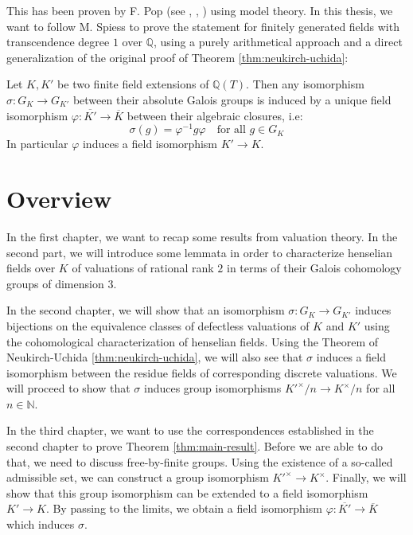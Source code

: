 This has been proven by F. Pop (see \cite{Po90}, \cite{Po94}, \cite{Po95}) using model theory. In this thesis, we want to follow M. Spiess \cite{Sp96} to prove the statement for finitely generated fields with transcendence degree $1$ over $\mathbb{Q}$, using a purely arithmetical approach and a direct generalization of the original proof of Theorem \ref{thm:neukirch-uchida}:

\pagebreak

\begin{theorem}\label{thm:main-result}
Let $K,K'$ be two finite field extensions of $\mathbb{Q}(T)$. Then any isomorphism $\sigma:G_K\to G_{K'}$ between their absolute Galois groups is induced by a unique field isomorphism $\varphi:\overline{K'}\to\overline{K}$ between their algebraic closures, i.e: 
\[\sigma(g) =\varphi^{-1}g\varphi \quad \text{for all }g\in G_K\]
In particular $\varphi$ induces a field isomorphism $K'\to K$.
\end{theorem}

\section{Overview}

In the first chapter, we want to recap some results from valuation theory. In the second part, we will introduce some lemmata in order to characterize henselian fields over $K$ of valuations of rational rank $2$ in terms of their Galois cohomology groups of dimension $3$.

In the second chapter, we will show that an isomorphism $\sigma: G_K\to G_{K'}$ induces bijections on the equivalence classes of defectless valuations of $K$ and $K'$ using the cohomological characterization of henselian fields. Using the Theorem of Neukirch-Uchida \ref{thm:neukirch-uchida}, we will also see that $\sigma$ induces a field isomorphism between the residue fields of corresponding discrete valuations. We will proceed to show that $\sigma$ induces group isomorphisms $K'^\times/n\to K^\times/n$ for all $n\in\mathbb{N}$.

In the third chapter, we want to use the correspondences established in the second chapter to prove Theorem \ref{thm:main-result}. Before we are able to do that, we need to discuss free-by-finite groups. Using the existence of a so-called admissible set, we can construct a group isomorphism $K'^\times\to K^\times$. Finally, we will show that this group isomorphism can be extended to a field isomorphism $K'\to K$. By passing to the limits, we obtain a field isomorphism $\varphi: \overline{K'}\to\overline{K}$ which induces $\sigma$.

